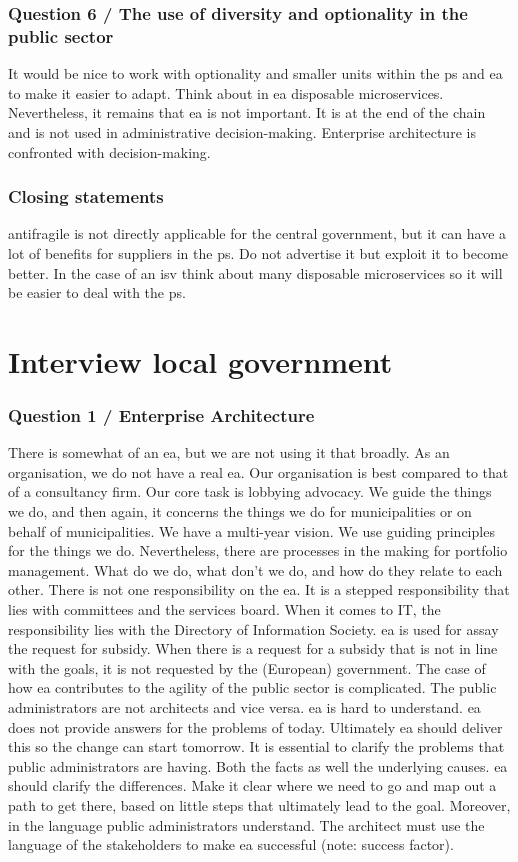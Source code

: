 \subsubsection{Question 6 / The use of diversity and optionality in the public sector}
It would be nice to work with optionality and smaller units within the \gls{ps} and \acrshort{ea} to make it easier to adapt. Think about in \acrshort{ea} disposable microservices. Nevertheless, it remains that \acrshort{ea} is not important. It is at the end of the chain and is not used in administrative decision-making. Enterprise architecture is confronted with decision-making.
\subsubsection{Closing statements}
\Gls{antifragile} is not directly applicable for the central government, but it can have a lot of benefits for suppliers in the \gls{ps}. Do not advertise it but exploit it to become better. In the case of an \acrfull{isv} think about many disposable microservices so it will be easier to deal with the \gls{ps}.
\section{Interview local government}
\label{sec:interviewlocalgovernment}
\subsubsection{Question 1 / Enterprise Architecture}
There is somewhat of an \acrshort{ea}, but we are not using it that broadly. As an organisation, we do not have a real \acrshort{ea}. Our organisation is best compared to that of a consultancy firm. Our core task is lobbying advocacy. We guide the things we do, and then again, it concerns the things we do for municipalities or on behalf of municipalities. We have a multi-year vision. We use guiding principles for the things we do.
Nevertheless, there are processes in the making for portfolio management. What do we do, what don't we do, and how do they relate to each other. There is not one responsibility on the \acrshort{ea}. It is a stepped responsibility that lies with committees and the services board. When it comes to IT, the responsibility lies with the Directory of Information Society. \acrshort{ea} is used for assay the request for subsidy. When there is a request for a subsidy that is not in line with the goals, it is not requested by the (European) government.
The case of how \acrshort{ea} contributes to the agility of the public sector is complicated. The public administrators are not architects and vice versa. \acrshort{ea} is hard to understand. \acrshort{ea} does not provide answers for the problems of today. Ultimately \acrshort{ea} should deliver this so the change can start tomorrow. It is essential to clarify the problems that public administrators are having. Both the facts as well the underlying causes. \acrshort{ea} should clarify the differences. Make it clear where we need to go and map out a path to get there, based on little steps that ultimately lead to the goal. Moreover, in the language public administrators understand. The architect must use the language of the stakeholders to make \acrshort{ea} successful (note: success factor).
